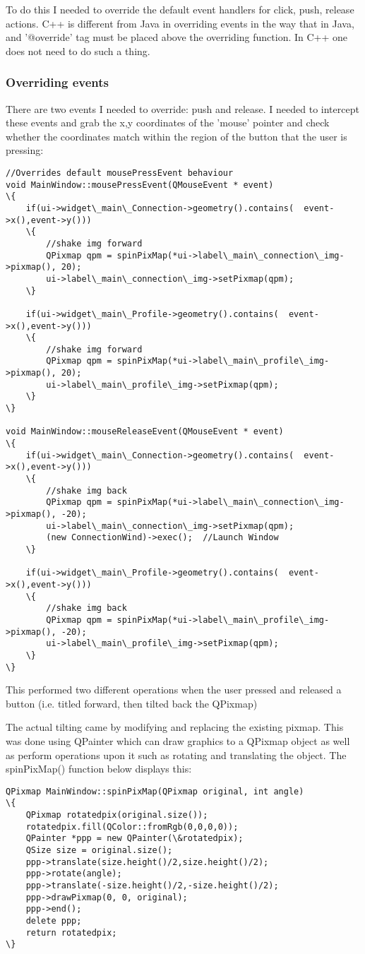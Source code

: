 To do this I needed to override the default event handlers for click, push, release actions. C++ is different from Java in overriding events in the way that in Java, and '@override' tag must be placed above the overriding function. In C++ one does not need to do such a thing.
\subsubsection{Overriding events}
There are two events I needed to override: push and release. I needed to intercept these events and grab the x,y coordinates of the 'mouse' pointer and check whether the  coordinates match within the region of the button that the user is pressing:
\begin{lstlisting}
//Overrides default mousePressEvent behaviour
void MainWindow::mousePressEvent(QMouseEvent * event)
\{
    if(ui->widget\_main\_Connection->geometry().contains(  event->x(),event->y()))
    \{
        //shake img forward
        QPixmap qpm = spinPixMap(*ui->label\_main\_connection\_img->pixmap(), 20);
        ui->label\_main\_connection\_img->setPixmap(qpm);
    \}

    if(ui->widget\_main\_Profile->geometry().contains(  event->x(),event->y()))
    \{
        //shake img forward
        QPixmap qpm = spinPixMap(*ui->label\_main\_profile\_img->pixmap(), 20);
        ui->label\_main\_profile\_img->setPixmap(qpm);
    \}
\}

void MainWindow::mouseReleaseEvent(QMouseEvent * event)
\{
    if(ui->widget\_main\_Connection->geometry().contains(  event->x(),event->y()))
    \{
        //shake img back
        QPixmap qpm = spinPixMap(*ui->label\_main\_connection\_img->pixmap(), -20);
        ui->label\_main\_connection\_img->setPixmap(qpm);
        (new ConnectionWind)->exec();  //Launch Window
    \}

    if(ui->widget\_main\_Profile->geometry().contains(  event->x(),event->y()))
    \{
        //shake img back
        QPixmap qpm = spinPixMap(*ui->label\_main\_profile\_img->pixmap(), -20);
        ui->label\_main\_profile\_img->setPixmap(qpm);
    \}
\}
\end{lstlisting}
This performed two different operations when the user pressed and released a button (i.e. titled forward, then tilted back the QPixmap)

The actual tilting came by modifying and replacing the existing pixmap. This was done using QPainter which can draw graphics to a QPixmap object as well as perform operations upon it such as rotating and translating the object. The spinPixMap() function below displays this:
\begin{lstlisting}
QPixmap MainWindow::spinPixMap(QPixmap original, int angle)
\{
    QPixmap rotatedpix(original.size());
    rotatedpix.fill(QColor::fromRgb(0,0,0,0));
    QPainter *ppp = new QPainter(\&rotatedpix);
    QSize size = original.size();
    ppp->translate(size.height()/2,size.height()/2);
    ppp->rotate(angle);
    ppp->translate(-size.height()/2,-size.height()/2);
    ppp->drawPixmap(0, 0, original);
    ppp->end();
    delete ppp;
    return rotatedpix;
\}
\end{lstlisting}

